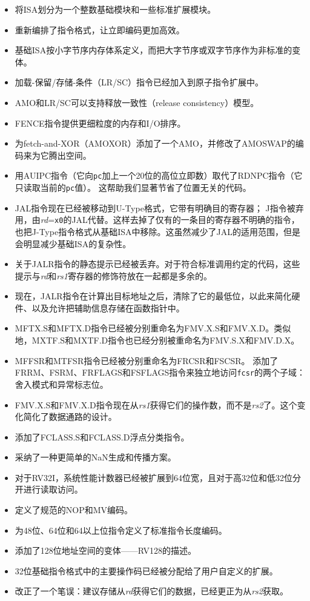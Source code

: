 \vspace{-0.1in}
\begin{itemize}
\parskip 0pt
\itemsep 1pt
\item 将ISA划分为一个整数基础模块和一些标准扩展模块。
\item 重新编排了指令格式，让立即编码更加高效。
\item 基础ISA按小字节序内存体系定义，而把大字节序或双字节序作为非标准的变体。
\item 加载-保留/存储-条件（LR/SC）指令已经加入到原子指令扩展中。
\item AMO和LR/SC可以支持释放一致性（release consistency）模型。
\item FENCE指令提供更细粒度的内存和I/O排序。
\item 为fetch-and-XOR（AMOXOR）添加了一个AMO，并修改了AMOSWAP的编码来为它腾出空间。
\item 用AUIPC指令（它向{\tt pc}加上一个20位的高位立即数）取代了RDNPC指令（它只读取当前的{\tt pc}值）。
这帮助我们显著节省了位置无关的代码。
\item JAL指令现在已经被移动到U-Type格式，它带有明确目的寄存器；
J指令被弃用，由{\em rd}={\tt x0}的JAL代替。这样去掉了仅有的一条目的寄存器不明确的指令，
也把J-Type指令格式从基础ISA中移除。这虽然减少了JAL的适用范围，但是会明显减少基础ISA的复杂性。
\item 关于JALR指令的静态提示已经被丢弃。对于符合标准调用约定的代码，这些提示与{\em rd}和{\em rs1}寄存器的修饰符放在一起都是多余的。
\item 现在，JALR指令在计算出目标地址之后，清除了它的最低位，以此来简化硬件、以及允许把辅助信息存储在函数指针中。
\item MFTX.S和MFTX.D指令已经被分别重命名为FMV.X.S和FMV.X.D。类似地，MXTF.S和MXTF.D指令也已经分别被重命名为FMV.S.X和FMV.D.X。
\item MFFSR和MTFSR指令已经被分别重命名为FRCSR和FSCSR。
添加了FRRM、FSRM、FRFLAGS和FSFLAGS指令来独立地访问{\tt fcsr}的两个子域：舍入模式和异常标志位。
\item FMV.X.S和FMV.X.D指令现在从{\em rs1}获得它们的操作数，而不是{\em rs2}了。这个变化简化了数据通路的设计。
\item 添加了FCLASS.S和FCLASS.D浮点分类指令。
\item 采纳了一种更简单的NaN生成和传播方案。
\item 对于RV32I，系统性能计数器已经被扩展到64位宽，且对于高32位和低32位分开进行读取访问。
\item 定义了规范的NOP和MV编码。
\item 为48位、64位和64以上位指令定义了标准指令长度编码。
\item 添加了128位地址空间的变体——RV128的描述。
\item 32位基础指令格式中的主要操作码已经被分配给了用户自定义的扩展。
\item 改正了一个笔误：建议存储从{\em rd}获得它们的数据，已经更正为从{\em rs2}获取。
\end{itemize}
\vspace{-0.1in}
